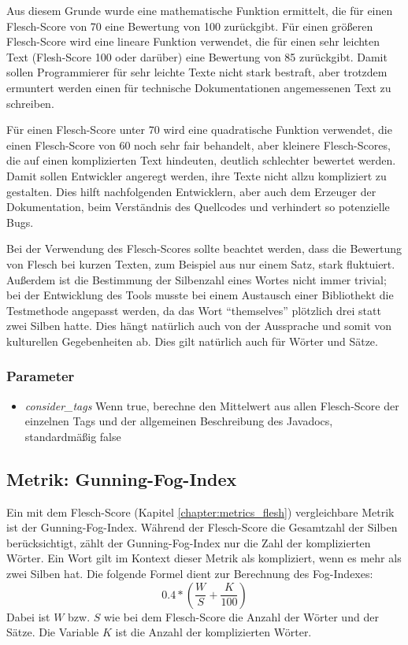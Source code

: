 Aus diesem Grunde wurde eine mathematische Funktion ermittelt, die für einen Flesch-Score von 70 eine Bewertung von 100 zurückgibt. Für einen größeren Flesch-Score wird eine lineare Funktion verwendet, die für einen sehr leichten Text (Flesh-Score 100 oder darüber) eine Bewertung von 85 zurückgibt. Damit sollen Programmierer für sehr leichte Texte nicht stark bestraft, aber trotzdem ermuntert werden einen für technische Dokumentationen angemessenen Text zu schreiben.

Für einen Flesch-Score unter 70 wird eine quadratische Funktion verwendet, die einen Flesch-Score von 60 noch sehr fair behandelt, aber kleinere Flesch-Scores, die auf einen komplizierten Text hindeuten, deutlich schlechter bewertet werden. Damit sollen Entwickler angeregt werden, ihre Texte nicht allzu kompliziert zu gestalten. Dies hilft nachfolgenden Entwicklern, aber auch dem Erzeuger der Dokumentation, beim Verständnis des Quellcodes und verhindert so potenzielle Bugs.

Bei der Verwendung des Flesch-Scores sollte beachtet werden, dass die Bewertung von Flesch bei kurzen Texten, zum Beispiel aus nur einem Satz, stark fluktuiert. Außerdem ist die Bestimmung der Silbenzahl eines Wortes nicht immer trivial; bei der Entwicklung des Tools musste bei einem Austausch einer Bibliothekt die Testmethode angepasst werden, da das Wort \enquote{themselves} plötzlich drei statt zwei Silben hatte. Dies hängt natürlich auch von der Aussprache und somit von kulturellen Gegebenheiten ab. Dies gilt natürlich auch für Wörter und Sätze. 
\subsubsection{Parameter}
\begin{itemize}
    \item \textit{consider\_tags} Wenn true, berechne den Mittelwert aus allen Flesch-Score der einzelnen Tags und der allgemeinen Beschreibung des Javadocs, standardmäßig false
\end{itemize}

\subsection{Metrik: Gunning-Fog-Index}\label{chapter:metric_gunning_fog}
Ein mit dem Flesch-Score (Kapitel \ref{chapter:metrics_flesh}) vergleichbare Metrik ist der Gunning-Fog-Index. Während der Flesch-Score die Gesamtzahl der Silben berücksichtigt, zählt der Gunning-Fog-Index nur die Zahl der komplizierten Wörter. Ein Wort gilt im Kontext dieser Metrik als kompliziert, wenn es mehr als zwei Silben hat. Die folgende Formel dient zur Berechnung des Fog-Indexes:
\begin{equation}
    0.4*(\frac{W}{S}+\frac{K}{100})
\end{equation}
Dabei ist $W$ bzw. $S$ wie bei dem Flesch-Score die Anzahl der Wörter und der Sätze. Die Variable $K$ ist die Anzahl der komplizierten Wörter. 


